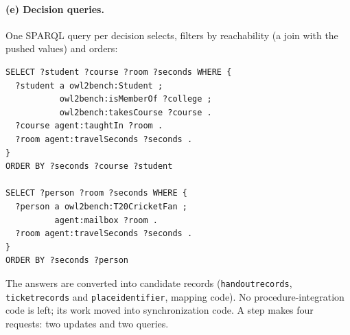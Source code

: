\documentclass[10pt]{article}
\newcommand{\brkunderscore}{\textunderscore\allowbreak}
\newcommand{\code}[1]{{\let\_\brkunderscore\texttt{#1}}}
\begin{document}
\paragraph{(e) Decision queries.} One SPARQL query per decision selects, filters by reachability (a join with the pushed
values) and orders:
\begin{lstlisting}[style=sq]
SELECT ?student ?course ?room ?seconds WHERE {
  ?student a owl2bench:Student ;
           owl2bench:isMemberOf ?college ;
           owl2bench:takesCourse ?course .
  ?course agent:taughtIn ?room .
  ?room agent:travelSeconds ?seconds .
}
ORDER BY ?seconds ?course ?student

SELECT ?person ?room ?seconds WHERE {
  ?person a owl2bench:T20CricketFan ;
          agent:mailbox ?room .
  ?room agent:travelSeconds ?seconds .
}
ORDER BY ?seconds ?person
\end{lstlisting}
The answers are converted into candidate records (\code{\_handout\_records}, \code{\_ticket\_records} and
\code{place\_identifier}, mapping code). No procedure-integration code is left; its work moved into synchronization code.
A step makes four requests: two updates and two queries.
\end{document}
